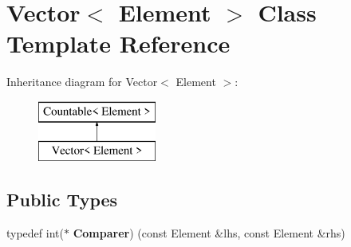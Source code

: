 \hypertarget{class_vector}{}\section{Vector$<$ Element $>$ Class Template Reference}
\label{class_vector}
Inheritance diagram for Vector$<$ Element $>$\+:\begin{figure}[H]
\begin{center}
\leavevmode
\includegraphics[height=2.000000cm]{class_vector}
\end{center}
\end{figure}
\subsection*{Public Types}
\begin{DoxyCompactItemize}
\item 
\hypertarget{class_vector_a034e75e4b64d98173281a4945cbbfc56}{}typedef int($\ast$ {\bfseries Comparer}) (const Element \&lhs, const Element \&rhs)\label{class_vector_a034e75e4b64d98173281a4945cbbfc56}

\end{DoxyCompactItemize}
